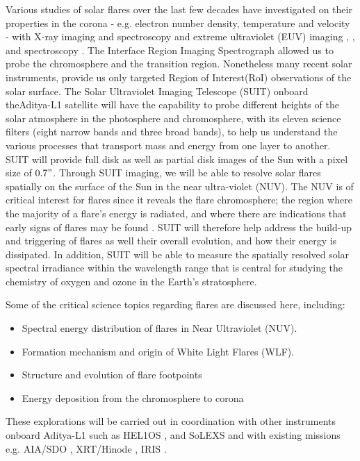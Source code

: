 \documentclass{article}
\begin{document}
Various studies of solar flares over the last few decades have investigated on their properties in the corona - e.g. electron number density, temperature and velocity -  with X-ray imaging \citep[Hinode/XRT,][]{xrt} and spectroscopy \citep[SO/STIX,][]{stix} and extreme ultraviolet (EUV) imaging \citep[SDO/AIA,][]{aia}, \citep[GOES/SUVI,][]{suvi}, \citep[STEREO,][]{stereo} and spectroscopy \citep[Hinode/EIS,][]{2007SoPh..243...19C}. The Interface Region Imaging Spectrograph \citep[IRIS,
][]{iris} allowed us to probe the chromosphere and the transition region. Nonetheless many recent solar instruments, provide us only targeted Region of Interest(RoI) observations of the solar surface. The Solar Ultraviolet Imaging Telescope (SUIT) \citep{ghosh16, article} onboard theAditya-L1 satellite \citep{adityal1} will have the capability to probe different heights of the solar atmosphere in the photosphere and chromosphere, with its eleven science filters (eight narrow bands and three broad bands), to help us understand the various processes that transport mass and energy from one layer to another. SUIT will provide full disk as well as partial disk images of the Sun with a pixel size of $0.7"$. Through SUIT imaging, we will be able to resolve solar flares spatially on the surface of the Sun in the near ultra-violet (NUV).  The NUV is of critical interest for flares since it reveals the flare chromosphere; the region where the majority of a flare's energy is radiated, and where there are indications that early signs of flares may be found \citep{2020ApJ...891...17P}. SUIT will therefore help address the build-up and triggering of flares as well their overall evolution, and how their energy is dissipated. In addition, SUIT will be able to measure the spatially resolved solar spectral irradiance within the wavelength range that is central for studying the chemistry of oxygen and ozone in the Earth's stratosphere.

Some of the critical science topics regarding flares are discussed here, including:

\begin{itemize}
    \item Spectral energy distribution of flares in Near Ultraviolet (NUV).
    \item Formation mechanism and origin of White Light Flares (WLF).
    \item Structure and evolution of flare footpoints
    \item Energy deposition from the chromosphere to corona
\end{itemize}
 These explorations will be carried out in coordination with other instruments onboard Aditya-L1 \citep{adityal1} such as HEL1OS \citep{adityaxspec17}, and SoLEXS \citep{solexs} and with existing missions e.g. AIA/SDO \citep{aia}, XRT/Hinode \citep{xrt}, IRIS \citep{iris}.
\end{document}
